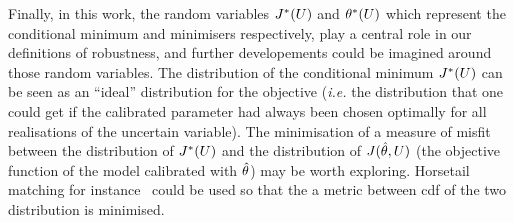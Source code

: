 \documentclass[../../Main_ManuscritThese.tex]{subfiles}
\begin{document}
Finally, in this work, the random variables $J^*(U)$ and
$\theta^*(U)$ which represent the conditional minimum and minimisers
respectively, play a central role in our definitions of robustness,
and further developements could be imagined around those random
variables.
The distribution of the conditional minimum $J^*(U)$ can be seen as
an ``ideal'' distribution for the objective (\emph{i.e.} the
distribution that one could get if the calibrated parameter had always
been chosen optimally for all realisations of the uncertain
variable). The minimisation of a measure of misfit between the
distribution of $J^*(U)$ and the distribution of $J(\hat{\theta},U)$
(the objective function of the model calibrated with $\hat{\theta}$) may
be worth exploring. Horsetail matching for
instance~\cite{cook_extending_2017,cook_horsetail_2018} could be used
so that the a metric between cdf of the two distribution is minimised.
\thispagestyle{plain}
\markchapterend
\subfileLocal{
	\pagestyle{empty}
	
        
}

\end{document}

